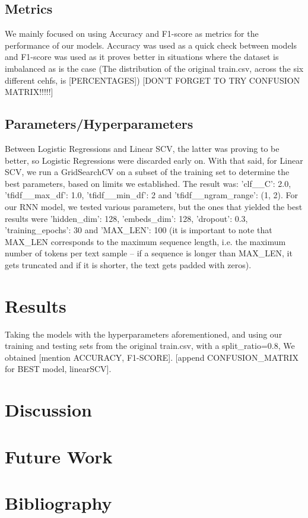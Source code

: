 \documentclass[twocolumn,10pt]{article}
\begin{document}
\subsection{Metrics}
We mainly focused on using Accuracy and F1-score as metrics for the performance of our models. Accuracy was used as a quick check between models and F1-score was used as it proves better in situations where the dataset is imbalanced as is the case (The distribution of the original train.csv, across the six different cehfs, is [PERCENTAGES]) [DON'T FORGET TO TRY CONFUSION MATRIX!!!!!]
\subsection{Parameters/Hyperparameters}
Between Logistic Regressions and Linear SCV, the latter was proving to be better, so Logistic Regressions were discarded early on. With that said, for Linear SCV, we run a GridSearchCV on a subset of the training set to determine the best parameters, based on limits we established. The result was: 'clf\_\_C': 2.0, 'tfidf\_\_max\_df': 1.0, 'tfidf\_\_min\_df': 2 and 'tfidf\_\_ngram\_range': (1, 2). For our RNN model, we tested various parameters, but the ones that yielded the best results were 'hidden\_dim': 128, 'embeds\_dim': 128, 'dropout': 0.3, 'training\_epochs': 30 and 'MAX\_LEN': 100 (it is important to note that MAX\_LEN corresponds to the maximum sequence length, i.e. the maximum number of tokens per text sample -- if a sequence is longer than MAX\_LEN, it gets truncated and if it is shorter, the text gets padded with zeros).


\section{Results}
Taking the models with the hyperparameters aforementioned, and using our training and testing sets from the original train.csv, with a split\_ratio=0.8, We obtained [mention ACCURACY, F1-SCORE]. [append CONFUSION\_MATRIX for BEST model, linearSCV].

\section{Discussion} 

\section{Future Work}

\section*{Bibliography}
\end{document}

